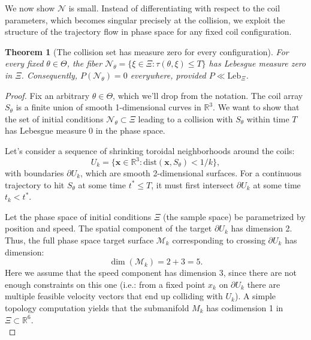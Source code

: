 \documentclass{article}
\newtheorem{thm}{Theorem}
\begin{document}
	We now show $\mathcal{N}$ is small. Instead of differentiating with respect to the coil parameters, which becomes singular precisely at the collision, we exploit the structure of the trajectory flow in phase space for any fixed coil configuration.
	
	\begin{thm}[The collision set has measure zero for every configuration] \label{thm:collision_null2}
		For every fixed $\theta \in \Theta$, the fiber $\mathcal{N}_\theta = \{\xi \in \Xi : \tau(\theta,\xi) \le T\}$ has Lebesgue measure zero in $\Xi$. Consequently, $P(\mathcal{N}_\theta) = 0$ everywhere, provided $P \ll \mathrm{Leb}_\Xi$.
	\end{thm}
	\begin{proof}
		Fix an arbitrary $\theta \in \Theta$, which we'll drop from the notation. The coil array $S_\theta$ is a finite union of smooth 1-dimensional curves in $\mathbb{R}^3$. We want to show that the set of initial conditions $\mathcal{N}_\theta \subset \Xi$ leading to a collision with $S_\theta$ within time $T$ has Lebesgue measure 0 in the phase space.
		
		Let's consider a sequence of shrinking toroidal neighborhoods around the coils:
		\begin{equation}
			U_k = \{ \mathbf{x} \in \mathbb{R}^3 : \mathrm{dist}(\mathbf{x}, S_\theta) < 1/k \},
		\end{equation} 
		with boundaries $\partial U_k$, which are smooth 2-dimensional surfaces. For a continuous trajectory to hit $S_\theta$ at some time $t^* \le T$, it must first intersect $\partial U_k$ at some time $t_k < t^*$. 
		
		Let the phase space of initial conditions $\Xi$ (the sample space) be parametrized by position and speed. The spatial component of the target $\partial U_k$ has dimension 2. Thus, the full phase space target surface $\mathcal{M}_k$ corresponding to crossing $\partial U_k$ has dimension: 
		\begin{equation}
			\dim(\mathcal{M}_k) = 2 + 3 = 5.
		\end{equation} 
		Here we assume that the speed component has dimension 3, since there are not enough constraints on this one (i.e.: from a fixed point $x_k$ on $\partial U_k$ there are multiple feasible velocity vectors that end up colliding with $U_k$). A simple topology computation yields that the submanifold $M_k$ has codimension 1 in $\Xi \subset \mathbb{R}^6$. \\
		

\end{proof}
\end{document}
